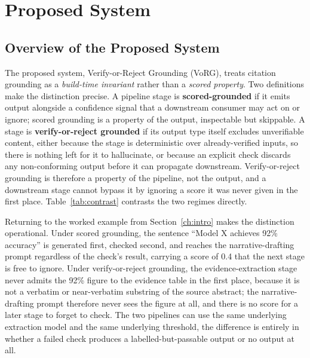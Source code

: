\documentclass[12pt,a4paper]{report}
\begin{document}
\section{Proposed System}

\subsection{Overview of the Proposed System}
The proposed system, Verify-or-Reject Grounding (VoRG), treats citation
grounding as a \emph{build-time invariant} rather than a \emph{scored
property}. Two definitions make the distinction precise. A pipeline stage is
\textbf{scored-grounded} if it emits output alongside a confidence signal that
a downstream consumer may act on or ignore; scored grounding is a property of
the output, inspectable but skippable. A stage is
\textbf{verify-or-reject grounded} if its output type itself excludes
unverifiable content, either because the stage is deterministic over
already-verified inputs, so there is nothing left for it to hallucinate, or
because an explicit check discards any non-conforming output before it can
propagate downstream. Verify-or-reject grounding is therefore a property of
the pipeline, not the output, and a downstream stage cannot bypass it by
ignoring a score it was never given in the first place.
Table~\ref{tab:contrast} contrasts the two regimes directly.

Returning to the worked example from Section~\ref{ch:intro} makes the
distinction operational. Under scored grounding, the sentence ``Model X
achieves 92\% accuracy'' is generated first, checked second, and reaches the
narrative-drafting prompt regardless of the check's result, carrying a score
of 0.4 that the next stage is free to ignore. Under verify-or-reject
grounding, the evidence-extraction stage never admits the 92\% figure to the
evidence table in the first place, because it is not a verbatim or
near-verbatim substring of the source abstract; the narrative-drafting prompt
therefore never sees the figure at all, and there is no score for a later
stage to forget to check. The two pipelines can use the same underlying
extraction model and the same underlying threshold, the difference is
entirely in whether a failed check produces a labelled-but-passable output or
no output at all.
\end{document}
